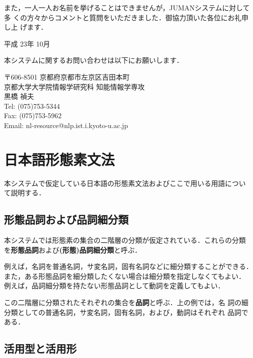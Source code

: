 \documentclass[a4j,titlepage]{jarticle}
\begin{document}
また，一人一人お名前を挙げることはできませんが，JUMANシステムに対して多
くの方々からコメントと質問をいただきました．御協力頂いた各位にお礼申し上
げます．

\begin{flushright}
平成 23年 10月
\end{flushright}

\vfill

\noindent
本システムに関するお問い合わせは以下にお願いします．

\noindent
〒606-8501 京都府京都市左京区吉田本町 \\
京都大学大学院情報学研究科 知能情報学専攻 \\
黒橋 禎夫 \\
Tel: (075)753-5344 \\
Fax: (075)753-5962 \\
Email: {\sf nl-resource@nlp.ist.i.kyoto-u.ac.jp}

\clearpage

\section{日本語形態素文法}\label{s:jmg}

本システムで仮定している日本語の形態素文法およびここで用いる用語につい
て説明する．

\subsection{形態品詞および品詞細分類}
\label{ss:jmg-h}

本システムでは形態素の集合の二階層の分類が仮定されている．これらの分類
を{\bf 形態品詞}および{\bf (形態)品詞細分類}と呼ぶ．

例えば，名詞を普通名詞，サ変名詞，固有名詞などに細分類することができる．
また，ある形態品詞を細分類したくない場合は細分類を指定しなくてもよい．
例えば，品詞細分類を持たない形態品詞として動詞を定義してもよい．

この二階層に分類されたそれぞれの集合を{\bf 品詞}と呼ぶ．上の例では，名
詞の細分類としての普通名詞，サ変名詞，固有名詞，および，動詞はそれぞれ
品詞である．

\subsection{活用型と活用形}
\label{ss:jmg-k}
\end{document}
